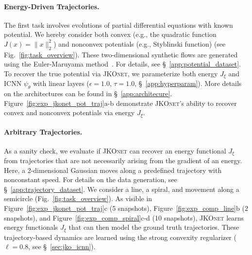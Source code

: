 \paragraph{Energy-Driven Trajectories.} The first task involves evolutions of partial differential equations with known potential. We hereby consider both convex (e.g., the quadratic function $J(x) = \|x\|^2_2$) and nonconvex potentials (e.g., Styblinski function) (see Fig.~\ref{fig:task_overview}). These two-dimensional synthetic flows are generated using the Euler-Maruyama method~\citep{kloeden1992stochastic}. For details, see \S~\ref{app:potential_dataset}.
To recover the true potential via \textsc{JKOnet}, we parameterize both energy $J_\xi$ and ICNN $\psi_\theta$ with linear layers ($\epsilon = 1.0$, $\tau = 1.0$, \S~\ref{app:hyperparam}). More details on the architectures can be found in \S~\ref{app:architecure}.
Figure~\ref{fig:exp_jkonet_pot_traj}a-b demonstrate \textsc{JKOnet}'s ability to recover convex and nonconvex potentials via energy $J_\xi$.

\paragraph{Arbitrary Trajectories.} As a sanity check, we evaluate if \textsc{JKOnet} can recover an energy functional $J_\xi$ from trajectories that are not necessarily arising from the gradient of an energy. Here, a 2-dimensional Gaussian moves along a predefined trajectory with nonconstant speed. 
For details on the data generation, see \S~\ref{app:trajectory_dataset}.
We consider a line, a spiral, and movement along a semicircle (Fig.~\ref{fig:task_overview}). As visible in Figure~\ref{fig:exp_jkonet_pot_traj}c (5 snapshots), Figure~\ref{fig:exp_comp_line}b (2 snapshots), and Figure~\ref{fig:exp_comp_spiral}c-d (10 snapshots), \textsc{JKOnet} learns energy functionals $J_\xi$ that can then model the ground truth trajectories.
These trajectory-based dynamics are learned using the strong convexity regularizer ($\ell=0.8$, see \S~\ref{sec:jko_icnn}).

